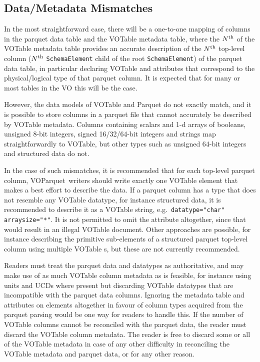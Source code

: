 \documentclass[11pt,a4paper]{ivoa}
\newcommand{\voparquet}{VOParquet}
\begin{document}
\subsection{Data/Metadata Mismatches}

In the most straightforward case, there will be a one-to-one mapping
of columns in the parquet data table and the VOTable metadata table,
where the $N^{\rm th}$  of the VOTable metadata table
provides an accurate description of the $N^{\rm th}$ top-level column
($N^{\rm th}$ {\tt SchemaElement} child of the root {\tt SchemaElement})
of the parquet data table,
in particular declaring VOTable  and 
attributes that
correspond to the physical/logical type of that parquet column.
It is expected that for many or most tables in the VO this will be the case.

However, the data models of VOTable and Parquet do not exactly match,
and it is possible to store columns in a parquet file that cannot
accurately be described by VOTable metadata.
Columns containing scalars and 1-d arrays of booleans,
unsigned 8-bit integers, signed 16/32/64-bit integers
and strings map straightforwardly to VOTable,
but other types such as unsigned 64-bit integers
and structured data do not.

In the case of such mismatches,
it is recommended that for each top-level parquet column,
\voparquet\ writers should write exactly one VOTable 
element that makes a best effort to describe the data.
If a parquet column has a type that does not resemble any VOTable datatype,
for instance structured data, it is recommended to describe it as a
VOTable string, e.g.\ \verb|datatype="char"| \verb|arraysize="*"|.
It is not permitted to omit the  attribute altogether,
since that would result in an illegal VOTable document.
Other approaches are possible, for instance describing
the primitive sub-elements of a structured parquet top-level column
using multiple VOTable s,
but these are not currently recommended.

Readers must treat the parquet data and datatypes as authoritative,
and may make use of as much VOTable column metadata as is feasible,
for instance using units and UCDs where present but discarding
VOTable datatypes that are incompatible with the parquet data columns.
Ignoring the metadata table  and  attributes
on  elements altogether in favour of column types acquired
from the parquet parsing would be one way for readers to handle this.
If the number of VOTable columns cannot be reconciled with the parquet data,
the reader must discard the VOTable column metadata.
The reader is free to discard some or all of the VOTable metadata
in case of any other difficulty in reconciling the VOTable metadata
and parquet data, or for any other reason.
\end{document}

